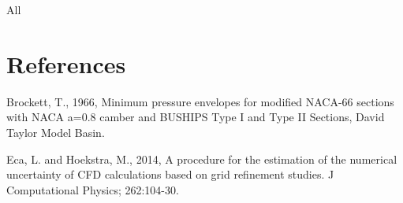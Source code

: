\documentclass[onecolumn,11pt]{report}
\begin{document}
All 



\chapter*{References}

Brockett, T., 1966, Minimum pressure envelopes for modified NACA-66 sections with NACA a=0.8 camber and BUSHIPS Type I and Type II Sections, David Taylor Model Basin. 

Eca, L. and Hoekstra, M., 2014, A procedure for the estimation of the numerical uncertainty of CFD calculations based on grid refinement studies. J Computational Physics; 262:104-30.


%
\end{document}
